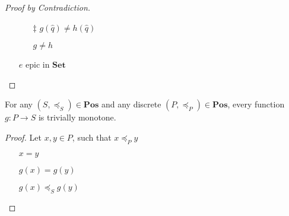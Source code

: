 \begin{lemma}
\begin{proof}[Proof by Contradiction]
\begin{itemize}
      \item[\phs]
        \begin{itemize}
          \item[$\ddagger$]
            $g(\hat{q})\neq h(\hat{q})$

          \item[\imps]
            $g\neq h$
            \marginnote{\Def-$\neq$}
        \end{itemize}

        \item[\contras] $e$ epic in $\mathbf{Set}$
          \qedhere
          \marginnote{\Contra-$\dagger$,~$\ddagger$}
    \end{itemize}
  \end{proof}
\end{lemma}

\begin{lemma}\label{lemma:discrete-poset-monotone}
  For any $(S, \preceq_S)\in\mathbf{Pos}$ and any discrete $(P, \preceq_P)\in\mathbf{Pos}$, every function $g : P \to S$ is trivially monotone.

  \begin{proof}
    Let $x, y\in P$, such that $x\preceq_Py$
    \begin{itemize}
      \item[\imps] $x = y$

      \item[\imps] $g(x) = g(y)$

      \item[\imps] $g(x) \preceq_S g(y)$
        \qedhere
    \end{itemize}

  \end{proof}
\end{lemma}

